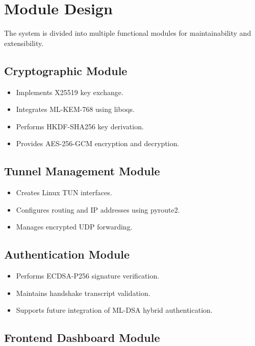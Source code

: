 \section{Module Design}

The system is divided into multiple functional modules for maintainability and extensibility.

\subsection{Cryptographic Module}

\begin{itemize}
    \item Implements X25519 key exchange.
    \item Integrates ML-KEM-768 using liboqs.
    \item Performs HKDF-SHA256 key derivation.
    \item Provides AES-256-GCM encryption and decryption.
\end{itemize}

\subsection{Tunnel Management Module}

\begin{itemize}
    \item Creates Linux TUN interfaces.
    \item Configures routing and IP addresses using pyroute2.
    \item Manages encrypted UDP forwarding.
\end{itemize}

\subsection{Authentication Module}

\begin{itemize}
    \item Performs ECDSA-P256 signature verification.
    \item Maintains handshake transcript validation.
    \item Supports future integration of ML-DSA hybrid authentication.
\end{itemize}

\subsection{Frontend Dashboard Module}

